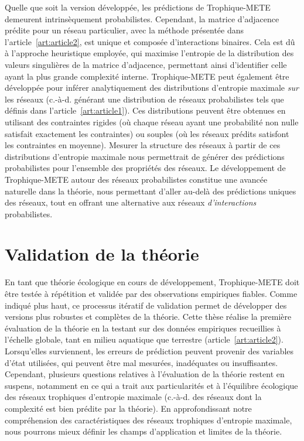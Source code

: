 Quelle que soit la version développée, les prédictions de Trophique-METE
demeurent intrinsèquement probabilistes. Cependant, la matrice d'adjacence
prédite pour un réseau particulier, avec la méthode présentée dans
l'article~\ref{art:article2}, est unique et composée d'interactions binaires.
Cela est dû à l'approche heuristique employée, qui maximise l'entropie de la
distribution des valeurs singulières de la matrice d'adjacence, permettant ainsi
d'identifier celle ayant la plus grande complexité interne. Trophique-METE peut
également être développée pour inférer analytiquement des distributions
d'entropie maximale \textit{sur} les réseaux (c.-à-d. générant une distribution
de réseaux probabilistes tels que définis dans l'article~\ref{art:article1}).
Ces distributions peuvent être obtenues en utilisant des contraintes rigides (où
chaque réseau ayant une probabilité non nulle satisfait exactement les
contraintes) ou souples (où les réseaux prédits satisfont les contraintes en
moyenne). Mesurer la structure des réseaux à partir de ces distributions
d'entropie maximale nous permettrait de générer des prédictions probabilistes
pour l'ensemble des propriétés des réseaux. Le développement de Trophique-METE
autour des réseaux probabilistes constitue une avancée naturelle dans la
théorie, nous permettant d'aller au-delà des prédictions uniques des réseaux,
tout en offrant une alternative aux réseaux \textit{d'interactions} probabilistes.  


\section{Validation de la théorie} 

En tant que théorie écologique en cours de développement, Trophique-METE doit
être testée à répétition et validée par des observations empiriques fiables.
Comme indiqué plus haut, ce processus itératif de validation permet de
développer des versions plus robustes et complètes de la théorie. Cette thèse
réalise la première évaluation de la théorie en la testant sur des données
empiriques recueillies à l'échelle globale, tant en milieu aquatique que
terrestre (article~\ref{art:article2}). Lorsqu'elles surviennent, les erreurs de
prédiction peuvent provenir des variables d'état utilisées, qui peuvent être mal
mesurées, inadéquates ou insuffisantes. Cependant, plusieurs questions relatives
à l'évaluation de la théorie restent en suspens, notamment en ce qui a trait aux
particularités et à l'équilibre écologique des réseaux trophiques d'entropie
maximale (c.-à-d. des réseaux dont la complexité est bien prédite par la
théorie). En approfondissant notre compréhension des caractéristiques des
réseaux trophiques d'entropie maximale, nous pourrons mieux définir les champs
d'application et limites de la théorie.

